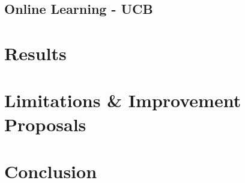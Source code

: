 \documentclass[12pt]{article}
\numberwithin{equation}{section}
\begin{document}
		
		
		
		\subsection{Online Learning - UCB}		\label{sec:implementation.ucb}

	\section{Results}		\label{sec:results}	%

	\section{Limitations \& Improvement Proposals}		\label{sec:limitations_improvements}

	\section{Conclusion}		\label{sec:conclusion}


	
	
\end{document}
